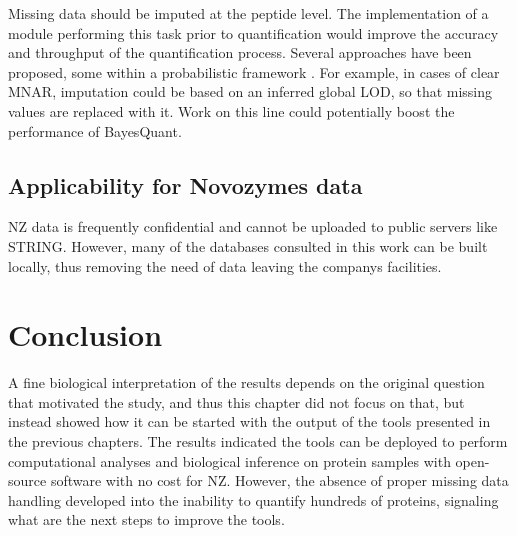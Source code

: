 Missing data should be imputed at the peptide level. The implementation of a module performing this task prior to quantification would  improve the accuracy and throughput of the quantification process. Several approaches have been proposed, some within a probabilistic framework \cite{Lazar2016}. For example, in cases of clear \ac{MNAR}, imputation could be based on an inferred global \ac{LOD}, so that missing values are replaced with it. Work on this line could potentially boost the performance of BayesQuant.


\subsection{Applicability for Novozymes data}

\ac{NZ} data is frequently confidential and cannot be uploaded to public servers like STRING. However, many of the databases consulted in this work can be built locally, thus removing the need of data leaving the company\textquotesingle s facilities.



\section{Conclusion}
A fine biological interpretation of the results depends on the original question that motivated the study, and thus this chapter did not focus on that, but instead showed how it can be started with the output of the tools presented in the previous chapters. The results indicated the tools can be deployed to perform computational analyses and biological inference on protein samples with open-source software with no cost for \ac{NZ}. However, the absence of proper missing data handling developed into the inability to quantify hundreds of proteins, signaling what are the next steps to improve the tools. 
